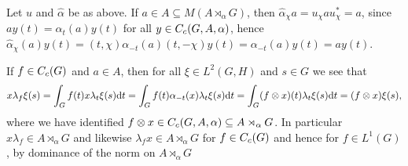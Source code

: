 \begin{note}
	Let $u$ and $\hat \alpha$ be as above. If $a \in A \subseteq M(A \rtimes_\alpha G)$, then $\hat \alpha_\chi a = u_\chi a u_\chi^* = a$, since $a y(t) = \alpha_t(a) y(t)$ for all $y \in C_c(G,A,\alpha)$, hence $\hat \alpha_\chi (a)y(t) = (t, \chi) \alpha_{-t}(a) (t,-\chi) y(t) = \alpha_{-t}(a) y(t) = ay(t)$.  

	If $f \in C_c(G)$ and $a \in A$, then for all $\xi \in L^2(G,H)$ and $s \in G$ we see that
	\begin{align*}
		x \lambda_f \xi(s) = \int_G f(t) x \lambda_t \xi(s) \mathrm{d} t = \int_G f(t) \alpha_{-t}(x) \lambda_t \xi(s) \mathrm{d} t = \int_G (f \otimes x)(t) \lambda_t \xi(s) \mathrm{d} t = (f \otimes x )\xi(s),
	\end{align*}
	where we have identified $f \otimes x \in C_c(G,A,\alpha)\subseteq A \rtimes_\alpha G$. In particular $x \lambda_f \in A \rtimes_\alpha G$ and likewise $\lambda_f x \in A \rtimes_\alpha G$ for $f \in C_c(G)$ and hence for $f \in L^1(G)$, by dominance of the norm on $A \rtimes_\alpha G$
\end{note}

